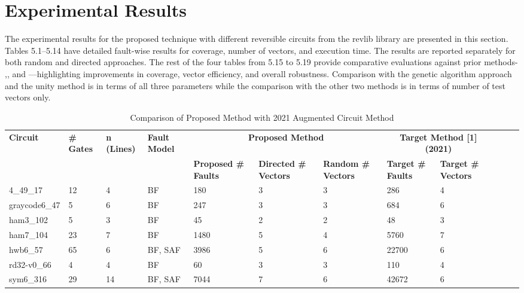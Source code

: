 \documentclass[conference]{IEEEtran}
\begin{document}
\section{Experimental Results}

The experimental results for the proposed technique with different reversible circuits from the revlib library are presented in this section. Tables 5.1–5.14 have detailed fault-wise results for coverage, number of vectors, and execution time. The results are reported separately for both random and directed approaches. The rest of the four tables from 5.15 to 5.19 provide comparative evaluations against prior methods- \cite{ref11},\cite{ref12}, \cite{ref14} and \cite{ref15}—highlighting improvements in coverage, vector efficiency, and overall robustness. Comparison with the genetic algorithm approach \cite{ref11} and the unity method \cite{ref15} is in terms of all three parameters while the comparison with the other two methods is in terms of number of test vectors only.


\begin{table}[t]
\centering
\scriptsize
\caption{Comparison of Proposed Method with 2021 Augmented Circuit Method}
\label{tab:augmented_2021}
\begin{tabular}{p{1.3cm} p{0.7cm} p{0.7cm} p{0.7cm} p{0.7cm} p{0.7cm} p{0.7cm} p{0.7cm} p{0.7cm} p{0.7cm} p{0.7cm} p{0.7cm}}
\hline
\multirow{2}{*}{\textbf{Circuit}} &
\multirow{2}{*}{\textbf{\# Gates}} &
\multirow{2}{*}{\textbf{n (Lines)}} &
\multirow{2}{*}{\textbf{Fault Model}} &
\multicolumn{3}{c|}{\textbf{Proposed Method}} &
\multicolumn{2}{c|}{\textbf{Target Method [1] (2021)}} \\
\cline{5-9}
 &  &  & 
 & \textbf{Proposed \# Faults}
 & \textbf{Directed \# Vectors}
 & \textbf{Random \# Vectors}
 & \textbf{Target \# Faults}
 & \textbf{Target \# Vectors} \\
\hline
4\_49\_17      & 12 & 4  & BF        & 180  & 3 & 3 & 286   & 4 \\
graycode6\_47 & 5  & 6  & BF        & 247  & 3 & 3 & 684   & 6 \\
ham3\_102     & 5  & 3  & BF        & 45   & 2 & 2 & 48    & 3 \\
ham7\_104     & 23 & 7  & BF        & 1480 & 5 & 4 & 5760  & 7 \\
hwb6\_57      & 65 & 6  & BF, SAF   & 3986 & 5 & 6 & 22700 & 6 \\
rd32-v0\_66   & 4  & 4  & BF        & 60   & 3 & 3 & 110   & 4 \\
sym6\_316     & 29 & 14 & BF, SAF   & 7044 & 7 & 6 & 42672 & 6 \\
\hline
\end{tabular}
\end{table}
\end{document}
